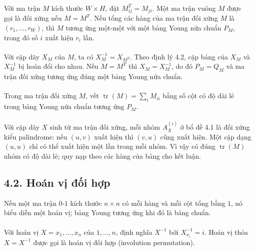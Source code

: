 \documentclass[11pt]{article}
\begin{document}
\paragraph{}
Với ma trận \(M\) kích thước \(W\times H\), đặt \(M^T_{ij}=M_{ji}\). Một ma
trận vuông \(M\) được gọi là đối xứng nếu \(M=M^T\). Nếu tổng các hàng của
ma trận đối xứng \(M\) là \((r_1,\ldots,r_W)\), thì \(M\) tương ứng một-một
với một bảng Young nửa chuẩn \(P_M\), trong đó số \(i\) xuất hiện \(r_i\) lần.

\paragraph{}
Với cặp dãy \(X_M\) của \(M\), ta có \(X_M^{-1}=X_{M^T}\). Theo định lý 4.2,
cặp bảng của \(X_M\) và \(X_M^{-1}\) bị hoán đổi cho nhau. Nếu \(M=M^T\) thì
\(X_M=X_M^{-1}\), do đó \(P_M=Q_M\) và ma trận đối xứng tương ứng đúng một
bảng Young nửa chuẩn.

\paragraph{}
Trong ma trận đối xứng \(M\), vết \(\operatorname{tr}(M)=\sum_i M_{ii}\) bằng
số cột có độ dài lẻ trong bảng Young nửa chuẩn tương ứng \(P_M\).

\paragraph{}
Với cặp dãy \(X\) sinh từ ma trận đối xứng, mỗi nhóm \(A_X^{(i)}\) ở bổ đề
4.1 là đối xứng kiểu palindrome: nếu \((u,v)\) xuất hiện thì \((v,u)\) cũng
xuất hiện. Một cặp dạng \((u,u)\) chỉ có thể xuất hiện một lần trong mỗi
nhóm. Vì vậy có đúng \(\operatorname{tr}(M)\) nhóm có độ dài lẻ; quy nạp theo
các hàng của bảng cho kết luận.

\subsection*{4.2. Hoán vị đối hợp}

Nếu một ma trận \(0\)-\(1\) kích thước \(n\times n\) có mỗi hàng và mỗi cột
tổng bằng \(1\), nó biểu diễn một hoán vị; bảng Young tương ứng khi đó là
bảng chuẩn.

\paragraph{}
Với hoán vị \(X=x_1,\ldots,x_n\) của \(1,\ldots,n\), định nghĩa \(X^{-1}\)
bởi \(X^{-1}_{x_i}=i\). Hoán vị thỏa \(X=X^{-1}\) được gọi là hoán vị đối hợp
(involution permutation).
\end{document}
